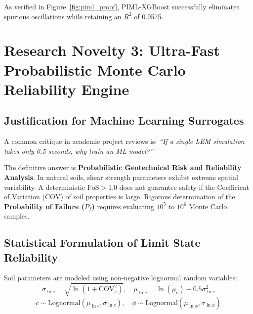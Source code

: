 \documentclass[12pt,a4paper,oneside]{report}
\begin{document}
As verified in Figure~\ref{fig:piml_proof}, PIML-XGBoost successfully eliminates spurious oscillations while retaining an $R^2$ of 0.9575.

\chapter{Research Novelty 3: Ultra-Fast Probabilistic Monte Carlo Reliability Engine}

\section{Justification for Machine Learning Surrogates}
A common critique in academic project reviews is: \textit{``If a single LEM simulation takes only 0.5 seconds, why train an ML model?''}

The definitive answer is \textbf{Probabilistic Geotechnical Risk and Reliability Analysis}. In natural soils, shear strength parameters exhibit extreme spatial variability. A deterministic $\text{FoS} > 1.0$ does not guarantee safety if the Coefficient of Variation ($\text{COV}$) of soil properties is large. Rigorous determination of the \textbf{Probability of Failure ($P_f$)} requires evaluating $10^5$ to $10^6$ Monte Carlo samples.

\begin{table}[htbp]
  \centering
  \caption{Computational Benchmark: Direct LEM vs. PIML Surrogate}
  \label{tab:speedup}
\end{table}

\section{Statistical Formulation of Limit State Reliability}
Soil parameters are modeled using non-negative lognormal random variables:
\begin{equation}
  \sigma_{\ln c} = \sqrt{\ln(1 + \text{COV}_c^2)}, \quad \mu_{\ln c} = \ln(\mu_c) - 0.5 \sigma_{\ln c}^2
\end{equation}
\begin{equation}
  c \sim \text{Lognormal}(\mu_{\ln c}, \sigma_{\ln c}), \quad \phi \sim \text{Lognormal}(\mu_{\ln \phi}, \sigma_{\ln \phi})
\end{equation}
\end{document}
